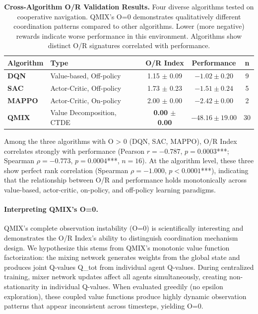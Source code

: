 \begin{table}[H]
\centering
\caption{\textbf{Cross-Algorithm O/R Validation Results.} Four diverse algorithms tested on cooperative navigation. QMIX's O=0 demonstrates qualitatively different coordination patterns compared to other algorithms. Lower (more negative) rewards indicate worse performance in this environment. Algorithms show distinct O/R signatures correlated with performance.}
\label{tab:cross_algorithm}
\begin{tabular}{llccc}
\toprule
\textbf{Algorithm} & \textbf{Type} & \textbf{O/R Index} & \textbf{Performance} & \textbf{n} \\
\midrule
\textbf{DQN} & Value-based, Off-policy & 1.15 $\pm$ 0.09 & $-1.02 \pm 0.20$ & 9 \\
\textbf{SAC} & Actor-Critic, Off-policy & 1.73 $\pm$ 0.23 & $-1.51 \pm 0.24$ & 5 \\
\textbf{MAPPO} & Actor-Critic, On-policy & 2.00 $\pm$ 0.00 & $-2.42 \pm 0.00$ & 2 \\
\textbf{QMIX} & Value Decomposition, CTDE & \textbf{0.00 $\pm$ 0.00} & $-48.16 \pm 19.00$ & 30 \\
\bottomrule
\end{tabular}
\end{table}

Among the three algorithms with O > 0 (DQN, SAC, MAPPO), O/R Index correlates strongly with performance (Pearson $r = -0.787$, $p = 0.0003$***; Spearman $\rho = -0.773$, $p = 0.0004$***, $n=16$). At the algorithm level, these three show perfect rank correlation (Spearman $\rho = -1.000$, $p < 0.0001$***), indicating that the relationship between O/R and performance holds monotonically across value-based, actor-critic, on-policy, and off-policy learning paradigms.

\paragraph{Interpreting QMIX's O=0.}
QMIX's complete observation instability (O=0) is scientifically interesting and demonstrates the O/R Index's ability to distinguish coordination mechanism design. We hypothesize this stems from QMIX's monotonic value function factorization: the mixing network generates weights from the global state and produces joint Q-values Q\_tot from individual agent Q-values. During centralized training, mixer network updates affect all agents simultaneously, creating non-stationarity in individual Q-values. When evaluated greedily (no epsilon exploration), these coupled value functions produce highly dynamic observation patterns that appear inconsistent across timesteps, yielding O=0.

